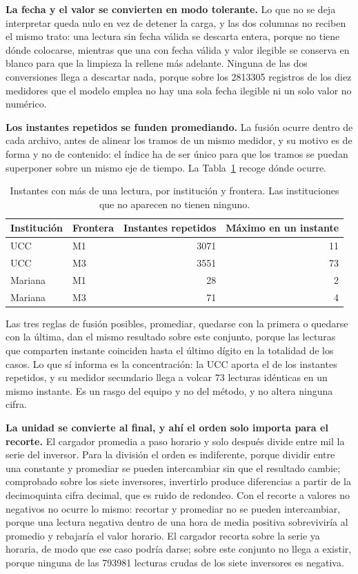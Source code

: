 \textbf{La fecha y el valor se convierten en modo tolerante.} Lo que no se
deja interpretar queda nulo en vez de detener la carga, y las dos columnas
no reciben el mismo trato: una lectura sin fecha válida se descarta entera,
porque no tiene dónde colocarse, mientras que una con fecha válida y valor
ilegible se conserva en blanco para que la limpieza la rellene más
adelante. Ninguna de las dos conversiones llega a descartar nada, porque
sobre los \num{2813305} registros de los diez medidores que el modelo
emplea no hay una sola fecha ilegible ni un solo valor no numérico.

\textbf{Los instantes repetidos se funden promediando.} La fusión ocurre
dentro de cada archivo, antes de alinear los tramos de un mismo medidor, y
su motivo es de forma y no de contenido: el índice ha de ser único para que
los tramos se puedan superponer sobre un mismo eje de tiempo. La
Tabla~\ref{tab:repro-dup} recoge dónde ocurre.

\begin{table}[H]
 \centering
 \caption{Instantes con más de una lectura, por institución y frontera. Las
 instituciones que no aparecen no tienen ninguno.}
 \label{tab:repro-dup}
 \begin{tabular}{@{}l l r r@{}}
 \toprule
 \textbf{Institución} & \textbf{Frontera} &
 \textbf{Instantes repetidos} & \textbf{Máximo en un instante} \\
 \midrule
 UCC & M1 & \num{3071} & 11 \\
 UCC & M3 & \num{3551} & 73 \\
 \addlinespace
 Mariana & M1 & \num{28} & 2 \\
 Mariana & M3 & \num{71} & 4 \\
 \bottomrule
 \end{tabular}
\end{table}

Las tres reglas de fusión posibles, promediar, quedarse con la primera o
quedarse con la última, dan el mismo resultado sobre este conjunto, porque
las lecturas que comparten instante coinciden hasta el último dígito en la
totalidad de los casos. Lo que sí informa es la concentración: la UCC
aporta el  de los instantes repetidos, y su medidor secundario
llega a volcar 73 lecturas idénticas en un mismo instante. Es un rasgo del
equipo y no del método, y no altera ninguna cifra.

\textbf{La unidad se convierte al final, y ahí el orden solo importa para
el recorte.} El cargador promedia a paso horario y solo después divide
entre mil la serie del inversor. Para la división el orden es indiferente,
porque dividir entre una constante y promediar se pueden intercambiar sin
que el resultado cambie; comprobado sobre los siete inversores, invertirlo
produce diferencias a partir de la decimoquinta cifra decimal, que es ruido
de redondeo. Con el recorte a valores no negativos no ocurre lo mismo:
recortar y promediar no se pueden intercambiar, porque una lectura negativa
dentro de una hora de media positiva sobreviviría al promedio y rebajaría
el valor horario. El cargador recorta sobre la serie ya horaria, de modo
que ese caso podría darse; sobre este conjunto no llega a existir, porque
ninguna de las \num{793981} lecturas crudas de los siete inversores es
negativa.

